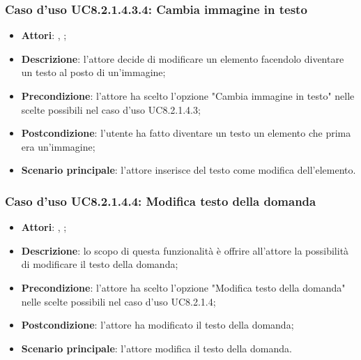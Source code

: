 		\subsubsection{Caso d'uso UC8.2.1.4.3.4: Cambia immagine in testo}
		\label{UC8.2.1.4.3.4}
		\begin{itemize}
			\item \textbf{Attori}: \uau, \uaupro;
			\item \textbf{Descrizione}: l'attore decide di modificare un elemento facendolo diventare un testo al posto di un'immagine;
			\item \textbf{Precondizione}: l'attore ha scelto l'opzione "Cambia immagine in testo" nelle scelte possibili nel caso d'uso UC8.2.1.4.3;
			\item \textbf{Postcondizione}: l'utente ha fatto diventare un testo un elemento che prima era un'immagine;
			\item \textbf{Scenario principale}: l'attore inserisce del testo come modifica dell'elemento.  
		\end{itemize}
		
			
	\subsubsection{Caso d'uso UC8.2.1.4.4: Modifica testo della domanda}
	\begin{itemize}
		\item
		\textbf{Attori}: \uau, \uaupro;
		\item		
		\textbf{Descrizione}: lo scopo di questa funzionalità è offrire all'attore la possibilità di modificare il testo della domanda;
		\item
		\textbf{Precondizione}: l'attore ha scelto l'opzione "Modifica testo della domanda" nelle scelte possibili nel caso d'uso UC8.2.1.4;
		\item \textbf{Postcondizione}: l'attore ha modificato il testo della domanda;
		\item \textbf{Scenario principale}: l'attore modifica il testo della domanda. 
		
	\end{itemize}
